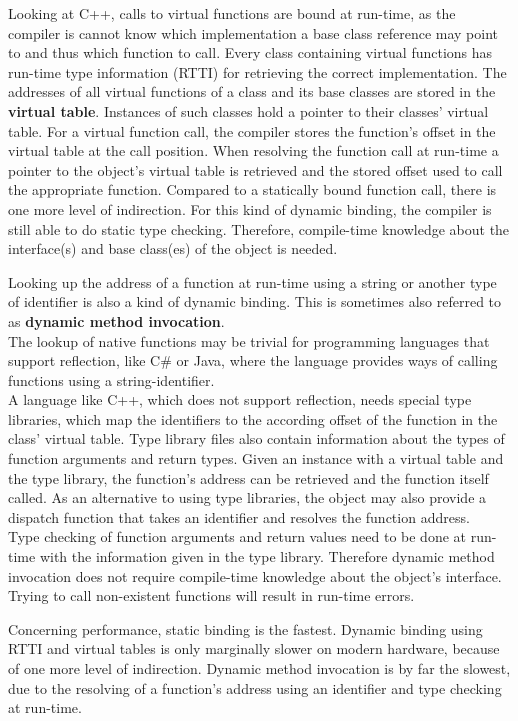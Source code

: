 Looking at C++, calls to virtual functions are bound at run-time, as the compiler is cannot know which implementation a base class reference may point to and thus which function to call. Every class containing virtual functions has run-time type information (RTTI) for retrieving the correct implementation. The addresses of all virtual functions of a class and its base classes are stored in the \textbf{virtual table}. Instances of such classes hold a pointer to their classes' virtual table. For a virtual function call, the compiler stores the function's offset in the virtual table at the call position. When resolving the function call at run-time a pointer to the object's virtual table is retrieved and the stored offset used to call the appropriate function. Compared to a statically bound function call, there is one more level of indirection. For this kind of dynamic binding, the compiler is still able to do static type checking. Therefore, compile-time knowledge about the interface(s) and base class(es) of the object is needed. 

Looking up the address of a function at run-time using a string or another type of identifier is also a kind of dynamic binding. This is sometimes also referred to as \textbf{dynamic method invocation}.\\
The lookup of native functions may be trivial for programming languages that support reflection, like C\# or Java, where the language provides ways of calling functions using a string-identifier.\\
A language like C++, which does not support reflection, needs special type libraries, which map the identifiers to the according offset of the function in the class' virtual table. Type library files also contain information about the types of function arguments and return types. Given an instance with a virtual table and the type library, the function's address can be retrieved and the function itself called. As an alternative to using type libraries, the object may also provide a dispatch function that takes an identifier and resolves the function address.
\\Type checking of function arguments and return values need to be done at run-time with the information given in the type library. Therefore dynamic method invocation does not require compile-time knowledge about the object's interface. Trying to call non-existent functions will result in run-time errors.

Concerning performance, static binding is the fastest. Dynamic binding using RTTI and virtual tables is only marginally slower on modern hardware, because of one more level of indirection. Dynamic method invocation is by far the slowest, due to the resolving of a function's address using an identifier and type checking at run-time. 

